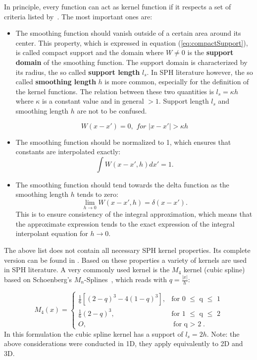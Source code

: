 \documentclass{report}
\newcommand{\norm}[1]{\left|#1\right|}
\begin{document}
In principle, every function can act as kernel function
if it respects a set of criteria listed by~\cite{Liu2003}.
The most important ones are:
\begin{itemize}
\item The smoothing function should vanish outside of a certain area around its
center. This property, which is expressed in equation (\ref{eq:compactSupport}), is called compact support and the domain where $W\neq0$
is the {\bf support domain} of the smoothing function.  The support domain is characterized by its radius, the so called {\bf support length} $l_s$. In SPH literature however, the so called {\bf smoothing length} $h$ is more common, especially for the definition of the kernel functions. The relation between these two quantities is $l_s=\kappa h$ where $\kappa$ is a constant value and in general $>1$. Support length $l_s$ and smoothing length $h$ are not to be confused.
 
\begin{equation}
\label{eq:compactSupport}
W(x-x')=0,\textit{ \ for \ }|x-x'|>\kappa h
\end{equation}

\item The smoothing function should be normalized to 1, which ensures that constants
are interpolated exactly:
\begin{equation}
\int{W(x-x',h)dx'}=1.
\end{equation}

\item The smoothing function should tend towards the delta function as the smoothing
length $h$ tends to zero:
\begin{equation}
\lim\limits_{h \rightarrow 0}{W(x-x',h)}=\delta(x-x').
\end{equation}
This is to ensure consistency of the integral approximation, which means that
the approximate expression tends to the exact expression of the integral
interpolant equation for $h \rightarrow 0$.
\end{itemize}
The above list does not contain all necessary SPH kernel properties. Its complete version can be found in \cite{Liu2003}.
Based on these properties a variety of kernels are used in SPH literature. A
very commonly used kernel is the $M_4$ kernel (cubic spline) based on Schoenberg's
$M_n$-Splines~\cite{Schoenberg1946}, which reads with $q=\frac{\norm{x}}{h}$:

\begin{equation}
\label{eq:cubicSpline}
M_{4}(x)=\begin{cases}
\frac{1}{6}[(2-q)^{3}-4(1-q)^{3}],& \text{for 0 $\leq$ q $\leq$ 1} \\
\frac{1}{6}(2-q)^{3},&  \text{for 1 $\leq$ q $\leq$ 2} \\
O,& \text{for q $>$ 2}.
\end{cases}
\end{equation}
In this formulation the cubic spline kernel has a support of $l_s=2h$.				
Note: the above considerations were conducted in 1D, they apply equivalently to 2D and 3D.
\end{document}
